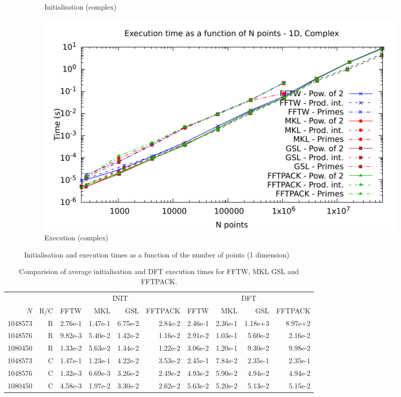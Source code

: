 \documentclass[12pt, a4paper]{article} \setlength{\textheight}{24cm}
\begin{document}
\begin{figure}[H]
\begin{subfigure}{.5\textwidth}
    \caption{Initialisation (complex)}
    \label{1DCI}
  \end{subfigure}%
  \begin{subfigure}{.5\textwidth}
    \centering
    \includegraphics[width=.9\linewidth]{graphs/1d-exec-c.pdf}
    \caption{Execution (complex)}
    \label{1DC}
  \end{subfigure}
  \caption{Initialisation and execution times as a function of the
    number of points (1 dimension)}
  \label{1D}
\end{figure}

\begin{small}
  \begin{table}[H]
    \centering
    \begin{tabular}{|rr|rrrr|rrrr|}
      \hline
      \multicolumn{2}{|c|}{ }& \multicolumn{4}{|c|}{INIT } & \multicolumn{4}{|c|}{DFT }  \\
      $N$ & R/C & FFTW & MKL & GSL & FFTPACK & FFTW & MKL & GSL & FFTPACK \\
      \hline
      \hline
      1048573 & R & 2.76e-1 & 1.47e-1 & 6.75e-2 & 2.84e-2 & 2.46e-1 & 2.36e-1 & 1.18e+3 & 8.97e+2 \\
      1048576 & R &  9.82e-3 & 5.40e-2 &  1.42e-2 &      1.16e-2 &    2.91e-2 &   1.03e-1 &  5.60e-2 & 2.16e-2 \\ 
      1080450 & R & 1.33e-2 & 5.63e-2  & 1.44e-2  & 1.22e-2  & 3.06e-2 & 1.20e-1 & 9.30e-2 & 9.98e-2  \\  
      \hline
      1048573 & C & 1.47e-1 & 1.23e-1 & 4.22e-2 & 3.53e-2 & 2.45e-1 & 7.84e-2 &  2.35e-1 & 2.35e-1 \\
      1048576 & C & 1.32e-3 &  6.69e-3 &      3.26e-2 & 2.49e-2 & 4.93e-2 &  5.90e-2 &  4.94e-2 &   4.94e-2  \\
      1080450 & C &  4.58e-3 & 1.97e-2  & 3.30e-2  & 2.62e-2 & 5.63e-2 & 5.20e-2 & 5.13e-2 & 5.15e-2 \\
      \hline
    \end{tabular}
    \caption{Comparision of average initialisation and DFT execution times for FFTW, MKL GSL and FFTPACK.}\label{Tbl:1D}
  \end{table}
\end{small}
\end{document}
